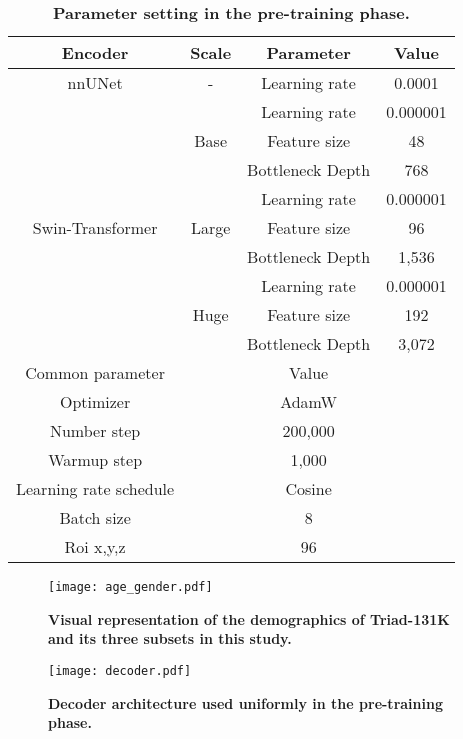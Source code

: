 \begin{table}[!ht]
	\centering
	\caption{\textbf{Parameter setting in the pre-training phase.}}
	\label{table:t3} 
	\begin{tabular}{cccc}
		\hline
		Encoder & Scale & Parameter & Value \\ \hline
		nnUNet & - & Learning rate & 0.0001 \\ 
		\hline
		\multirow{9}[1]{*}{Swin-Transformer} & \multirow{3}[1]{*}{Base} & Learning rate & 0.000001 \\ 
		~ & ~ & Feature size & 48 \\ 
		~ & ~ & Bottleneck Depth & 768 \\ 
		\cline{2-4}
		~ & \multirow{3}[1]{*}{Large} & Learning rate & 0.000001 \\ 
		~ & ~ & Feature size & 96 \\ 
		~ & ~ & Bottleneck Depth & 1,536 \\ 
		\cline{2-4}
		~ & \multirow{3}[1]{*}{Huge} & Learning rate & 0.000001 \\ 
		~ & ~ & Feature size & 192 \\ 
		~ & ~ & Bottleneck Depth & 3,072 \\ 
		\hline
		Common parameter & ~ & Value & ~ \\ 
		\hline
		Optimizer & & AdamW  & \\ 
		Number step & & 200,000 & \\ 
		Warmup step & & 1,000 & \\ 
		Learning rate schedule & & Cosine & \\ 
		Batch size & & 8 & \\ 
		Roi x,y,z & & 96 & \\ 
		\hline
	\end{tabular}
\end{table}
\clearpage

\begin{figure}[!t] 
	\centering
	\texttt{[image: age\_gender.pdf]}
	\caption{\textbf{Visual representation of the demographics of Triad-131K and its three subsets in this study.}}
	\label{fig:agegender} 
\end{figure}

\begin{figure}[!t] 
	\centering
	\texttt{[image: decoder.pdf]}
	\caption{\textbf{Decoder architecture used uniformly in the pre-training phase.}}
	\label{fig:decoder} 
\end{figure}


